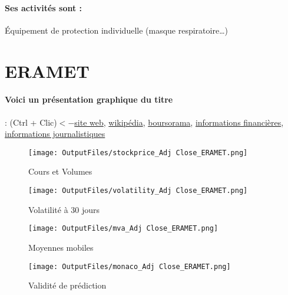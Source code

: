 \documentclass[11pt,a4paper]{report}%
\begin{document}
\paragraph{Ses activités sont : } Équipement de protection individuelle (masque respiratoire…) 
    
    \newpage

\section{ERAMET}

\paragraph{Voici un présentation graphique du titre} : (Ctrl + Clic)$<-$\href{http://www.eramet.com/fr/investisseurs}{site web}, \href{https://fr.wikipedia.org/wiki/Eramet}{wikipédia}, \href{https://www.boursorama.com/cours/1rPERA}{boursorama}, \href{https://www.qwant.com/?q=site:https:%2f%2fwww.easybourse.com%2faction-societe%2fERAMET&t=web&client=ext-firefox-hp}{informations financières}, \href{https://bourse.lerevenu.com/cours-de-bourse/fiche-valeur-synthese/ERAMET/ERA-FR}{informations journalistiques}
\begin{figure}[!htb]
   \begin{minipage}{0.5\textwidth}
     \centering
     \texttt{[image: OutputFiles/stockprice\_Adj Close\_ERAMET.png]}
     \caption{Cours et Volumes}\label{Fig:price_ERAMET}
   \end{minipage}\hfill
   \begin{minipage}{0.5\textwidth}
     \centering
     \texttt{[image: OutputFiles/volatility\_Adj Close\_ERAMET.png]}
     \caption{Volatilité à 30 jours}\label{Fig:volat_ERAMET}
   \end{minipage}
\end{figure}
\begin{figure}[!htb]
   \begin{minipage}{0.5\textwidth}
     \centering
     \texttt{[image: OutputFiles/mva\_Adj Close\_ERAMET.png]}
     \caption{Moyennes mobiles}\label{Fig:mva_ERAMET}
   \end{minipage}\hfill
   \begin{minipage}{0.5\textwidth}
     \centering
     \texttt{[image: OutputFiles/monaco\_Adj Close\_ERAMET.png]}
     \caption{Validité de prédiction}\label{Fig:prediction_ERAMET}
   \end{minipage}
\end{figure}
\end{document}
